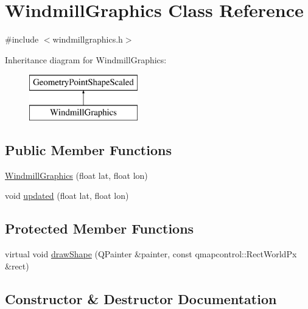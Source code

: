 \hypertarget{class_windmill_graphics}{}\section{Windmill\+Graphics Class Reference}
\label{class_windmill_graphics}


{\ttfamily \#include $<$windmillgraphics.\+h$>$}

Inheritance diagram for Windmill\+Graphics\+:\begin{figure}[H]
\begin{center}
\leavevmode
\includegraphics[height=2.000000cm]{dd/ddb/class_windmill_graphics}
\end{center}
\end{figure}
\subsection*{Public Member Functions}
\begin{DoxyCompactItemize}
\item 
\mbox{\hyperlink{class_windmill_graphics_a7ca301a62aa3df4cf40aa8047e14ab82}{Windmill\+Graphics}} (float lat, float lon)
\item 
void \mbox{\hyperlink{class_windmill_graphics_a149e8630bea678bdc0d750ab8b80246d}{updated}} (float lat, float lon)
\end{DoxyCompactItemize}
\subsection*{Protected Member Functions}
\begin{DoxyCompactItemize}
\item 
virtual void \mbox{\hyperlink{class_windmill_graphics_a84b23ff6fa00a8626701a47842feb799}{draw\+Shape}} (Q\+Painter \&painter, const qmapcontrol\+::\+Rect\+World\+Px \&rect)
\end{DoxyCompactItemize}


\subsection{Constructor \& Destructor Documentation}
\mbox{\label{class_windmill_graphics_a7ca301a62aa3df4cf40aa8047e14ab82}} 
